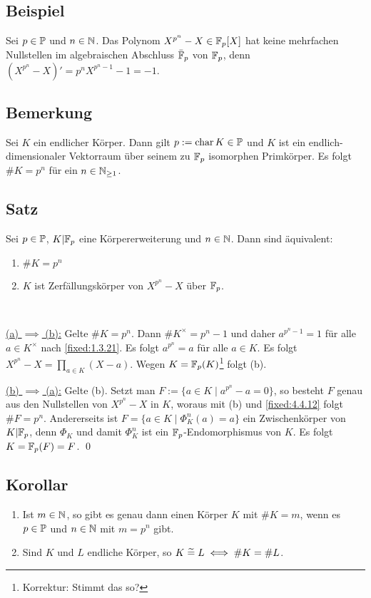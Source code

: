 \subsection{Beispiel} Sei $p \in \P$ und $n \in \N$. Das Polynom $X^{p^n} - X \in \F_p[X]$ hat keine mehrfachen Nullstellen im algebraischen Abschluss $\bar \F_p$ von $\F_p$, denn $(X^{p^n} - X)' = p^n X^{p^n-1}-1 = -1$.

\subsection{Bemerkung} Sei $K$ ein endlicher Körper. Dann gilt $p := \chara K \in \P$ und $K$ ist ein endlich-dimensionaler Vektorraum über seinem zu $\F_p$ isomorphen Primkörper. Es folgt $\#K = p^n$ für ein $n \in \N_{\geq 1}$.

\subsection{Satz} Sei $p \in \P$, $K|\F_p$ eine Körpererweiterung und $n \in \N$. Dann sind äquivalent:
\begin{enumerate}[label=(\alph*)]
	\item
		$\#K=p^n$
		
	\item
		$K$ ist Zerfällungskörper von $X^{p^n} - X$ über $\F_p$.
\end{enumerate}

\proof ~

\underline{(a) $\implies$ (b):} Gelte $\#K = p^n$. Dann $\# K^\times = p^n - 1$ und daher $a^{p^n-1}=1$ für alle $a \in K^\times$ nach \ref{fixed:1.3.21}. Es folgt $a^{p^n} = a$ für alle $a \in K$. Es folgt $X^{p^n}-X = \prod_{a \in K} (X-a)$. Wegen $K = \F_p(K)$\footnote{Korrektur: Stimmt das so?} folgt (b).

\underline{(b) $\implies$ (a):} Gelte (b). Setzt man $F := \{a \in K \mid a^{p^n} - a=0 \}$, so besteht $F$ genau aus den Nullstellen von $X^{p^n}-X$ in $K$, woraus mit (b) und \ref{fixed:4.4.12} folgt $\#F = p^n$. Andererseits ist $F = \{a \in K \mid \Phi_K^n(a)=a\}$ ein Zwischenkörper von $K|\F_p$, denn $\Phi_K$ und damit $\Phi_K^n$ ist ein $\F_p$-Endomorphismus von $K$. Es folgt $K = \F_p(F) = F$. \qed

\subsection{Korollar}
\begin{enumerate}[label=(\alph*)]
	\item
		Ist $m \in \N$, so gibt es genau dann einen Körper $K$ mit $\#K=m$, wenn es $p \in \P$ und $n \in \N$ mit $m = p^n$ gibt.
		
	\item
		Sind $K$ und $L$ endliche Körper, so $K \eqtilde L \iff \#K = \#L$.
\end{enumerate}

